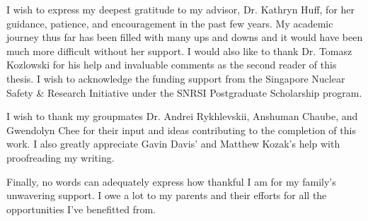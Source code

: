I wish to express my deepest gratitude to my advisor, Dr. Kathryn Huff, for
her guidance, patience, and encouragement in the past few years. My academic
journey thus far has been filled with many ups and downs and it would have
been much more difficult without her support. I would also like to thank Dr.
Tomasz Kozlowski for his help and invaluable comments as the second reader of
this thesis. I wish to acknowledge the funding support from the Singapore
Nuclear Safety \& Research Initiative under the SNRSI Postgraduate Scholarship
program.

I wish to thank my groupmates Dr. Andrei Rykhlevskii, Anshuman Chaube, and
Gwendolyn Chee for their input and ideas contributing to the completion of
this work. I also greatly appreciate Gavin Davis' and Matthew Kozak's help
with proofreading my writing. 

Finally, no words can adequately express how thankful I am for my family's
unwavering support. I owe a lot to my parents and their efforts for all the
opportunities I've benefitted from.